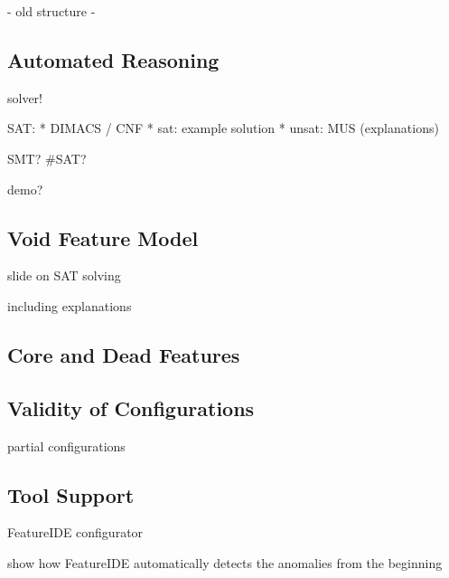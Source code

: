 
- old structure -

\subsection{Automated Reasoning}

solver!

SAT:
* DIMACS / CNF
* sat: example solution
* unsat: MUS (explanations)

SMT? \#SAT?

demo?

\subsection{Void Feature Model}

slide on SAT solving

including explanations

\subsection{Core and Dead Features}

\subsection{Validity of Configurations}

partial configurations

%
%

\subsection{Tool Support}

FeatureIDE configurator

show how FeatureIDE automatically detects the anomalies from the beginning


